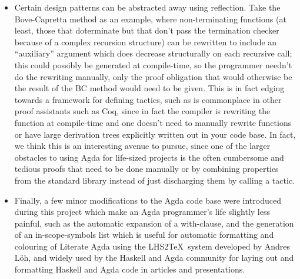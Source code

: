 \documentclass[a4paper]{article}
\begin{document}
\begin{itemize}
\item
Certain design patterns can be abstracted away
using reflection. Take the Bove-Capretta method as an example, where
non-terminating functions (at least, those that doterminate but that
don't pass the termination checker because of a complex recursion
structure) can be rewritten to include an ``auxiliary'' argument which
does decrease structurally on each recursive call; this could possibly
be generated at compile-time, so the programmer needn't do the
rewriting manually, only the proof obligation that would otherwise be
the result of the BC method would need to be given.
This is in fact edging towards a framework for defining tactics, such as is commonplace
in other proof assistants such as Coq, since in fact the compiler is rewriting the function at compile-time
and one doesn't need to manually rewrite functions or have large derivation trees explicitly written
out in your code base.     
In fact, we think this is an interesting avenue to pursue, since one of the larger
obstacles to using Agda for life-sized projects is the often cumbersome and tedious proofs that need to be
done manually or by combining properties from the standard library instead of just discharging them by calling a
tactic.




\item Finally, a few minor modifications to the Agda code base were introduced during this project which make an
Agda programmer's life slightly less painful, such as the automatic expansion of a with-clause, and the
generation of an in-scope-symbols list which is useful for automatic formatting and colouring of Literate
Agda using the LHS2\TeX\ system developed by Andres L\"oh, and widely used by the Haskell and Agda community for
laying out and formatting Haskell and Agda code in articles and presentations.

\end{itemize}
\end{document}
